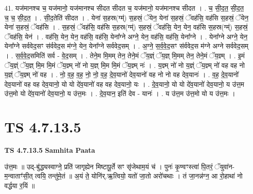 \documentclass[17pt]{extarticle}
\begin{document}
41. यज॑मानश्च च॒ यज॑मानो॒ यज॑मानश्च सीदत सीदत च॒ यज॑मानो॒ यज॑मानश्च सीदत । . च॒ सी॒द॒त॒ सी॒द॒त॒ च॒ च॒ सी॒द॒त॒ । . सी॒द॒तेति॑ सीदत । . येना॑ स॒हस्र(ग्म्॑) स॒हस्रं॒ ॅयेन॒ येना॑ स॒हस्रं॒ ॅवह॑सि॒ वह॑सि स॒हस्रं॒ ॅयेन॒ येना॑ स॒हस्रं॒ ॅवह॑सि । . स॒हस्रं॒ ॅवह॑सि॒ वह॑सि स॒हस्र(ग्म्॑) स॒हस्रं॒ ॅवह॑सि॒ येन॒ येन॒ वह॑सि स॒हस्र(ग्म्॑) स॒हस्रं॒ ॅवह॑सि॒ येन॑ । . वह॑सि॒ येन॒ येन॒ वह॑सि॒ वह॑सि॒ येना᳚ग्ने अग्ने॒ येन॒ वह॑सि॒ वह॑सि॒ येना᳚ग्ने । . येना᳚ग्ने अग्ने॒ येन॒ येना᳚ग्ने सर्ववेद॒सꣳ स॑र्ववेद॒स म॑ग्ने॒ येन॒ येना᳚ग्ने सर्ववेद॒सम् । . अ॒ग्ने॒ स॒र्व॒वे॒द॒सꣳ स॑र्ववेद॒स म॑ग्ने अग्ने सर्ववेद॒सम् । . स॒र्व॒वे॒द॒समिति॑ सर्व - वे॒द॒सम् । . तेने॒म मि॒मम् तेन॒ तेने॒मं ॅय॒ज्ञ्ं ॅय॒ज्ञ् मि॒मम् तेन॒ तेने॒मं ॅय॒ज्ञ्म् । . इ॒मं ॅय॒ज्ञ्ं ॅय॒ज्ञ् मि॒म मि॒मं ॅय॒ज्ञ्म् नो॑ नो य॒ज्ञ् मि॒म मि॒मं ॅय॒ज्ञ्म् नः॑ । . य॒ज्ञ्म् नो॑ नो य॒ज्ञ्ं ॅय॒ज्ञ्म् नो॑ वह वह नो य॒ज्ञ्ं ॅय॒ज्ञ्म् नो॑ वह । . नो॒ व॒ह॒ व॒ह॒ नो॒ नो॒ व॒ह॒ दे॒व॒यानो॑ देव॒यानो॑ वह नो नो वह देव॒यानः॑ । . व॒ह॒ दे॒व॒यानो॑ देव॒यानो॑ वह वह देव॒यानो॒ यो यो दे॑व॒यानो॑ वह वह देव॒यानो॒ यः । . दे॒व॒यानो॒ यो यो दे॑व॒यानो॑ देव॒यानो॒ य उ॑त्त॒म उ॑त्त॒मो यो दे॑व॒यानो॑ देव॒यानो॒ य उ॑त्त॒मः । . दे॒व॒यान॒ इति॑ देव - यानः॑ । . य उ॑त्त॒म उ॑त्त॒मो यो य उ॑त्त॒मः । \newline
\pagebreak
{}

\section{ TS 4.7.13.5 }

\textbf{TS 4.7.13.5 } \newline
\textbf{Samhita Paata} \newline

उ॑त्त॒मः ॥ उद्-बु॑द्ध्यस्वाग्ने॒ प्रति॑ जागृह्येन मिष्टापू॒र्ते सꣳ सृ॑जेथाम॒यं च॑ । पुनः॑ कृ॒ण्वꣳस्त्वा॑ पि॒तरं॒ ॅयुवा॑न-म॒न्वाताꣳ॑सी॒त् त्वयि॒ तन्तु॑मे॒तं ॥ अ॒यं ते॒ योनि॑र्.ऋ॒त्वियो॒ यतो॑ जा॒तो अरो॑चथाः । तं जा॒नन्न॑ग्न॒ आ रो॒हाथा॑ नो वर्द्धया र॒यिं ॥ \newline
\end{document}
